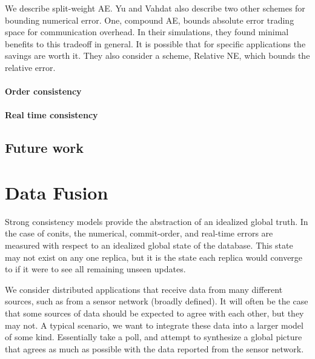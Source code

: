 \documentclass[]             %
{NASA}                       %
\theoremstyle{definition}
\begin{document}
We describe split-weight AE. Yu and Vahdat also describe two other
schemes for bounding numerical error. One, compound AE, bounds absolute
error trading space for communication overhead. In their simulations,
they found minimal benefits to this tradeoff in general. It is possible
that for specific applications the savings are worth it. They also
consider a scheme, Relative NE, which bounds the relative error.

\hypertarget{order-consistency-1}{%
\paragraph{Order consistency}\label{order-consistency-1}}

\hypertarget{real-time-consistency-1}{%
\paragraph{Real time consistency}\label{real-time-consistency-1}}

\hypertarget{future-work}{%
\subsection{Future work}\label{future-work}}

\hypertarget{data-fusion}{%
  \section{Data Fusion}\label{data-fusion}}

\cite{1999:lucien-datafusion}

\label{sec:data-fusion}

Strong consistency models provide the abstraction of an idealized global
truth. In the case of conits, the numerical, commit-order, and real-time
errors are measured with respect to an idealized global state of the
database. This state may not exist on any one replica, but it is the
state each replica would converge to if it were to see all remaining
unseen updates.

We consider distributed applications that receive data from many
different sources, such as from a sensor network (broadly defined). It
will often be the case that some sources of data should be expected to
agree with each other, but they may not. A typical scenario, we want to
integrate these data into a larger model of some kind. Essentially take
a poll, and attempt to synthesize a global picture that agrees as much
as possible with the data reported from the sensor network.
\end{document}
